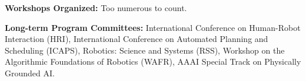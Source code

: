 
\vspace{1em}
\noindent \textbf{Workshops Organized:} Too numerous to count. 


\vspace{1em}
\noindent \textbf{Long-term Program Committees:} 
International Conference on Human-Robot Interaction (HRI),
International Conference on Automated Planning and Scheduling (ICAPS),
Robotics: Science and Systems (RSS),
Workshop on the Algorithmic Foundations of Robotics (WAFR),
AAAI Special Track on Physically Grounded AI.

